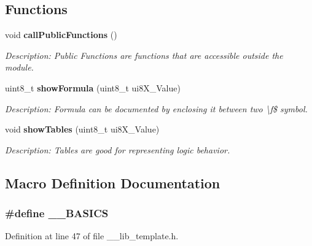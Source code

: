 \subsection*{Functions}
\begin{DoxyCompactItemize}
\item 
void {\bf call\-Public\-Functions} ()
\begin{DoxyCompactList}\small\item\em Description\-: Public Functions are functions that are accessible outside the module. \end{DoxyCompactList}\item 
uint8\-\_\-t {\bf show\-Formula} (uint8\-\_\-t ui8\-X\-\_\-\-Value)
\begin{DoxyCompactList}\small\item\em Description\-: Formula can be documented by enclosing it between two \textbackslash{}f\$ symbol. \end{DoxyCompactList}\item 
void {\bf show\-Tables} (uint8\-\_\-t ui8\-X\-\_\-\-Value)
\begin{DoxyCompactList}\small\item\em Description\-: Tables are good for representing logic behavior. \end{DoxyCompactList}\end{DoxyCompactItemize}


\subsection{Macro Definition Documentation}
\subsubsection[{\-\_\-\-\_\-\-B\-A\-S\-I\-C\-S}]{\setlength{\rightskip}{0pt plus 5cm}\#define \-\_\-\-\_\-\-B\-A\-S\-I\-C\-S}\label{____lib__template_8h_a7864a852d9905ab5240b86ec05b7dafb}


Definition at line 47 of file \-\_\-\-\_\-lib\-\_\-template.\-h.

